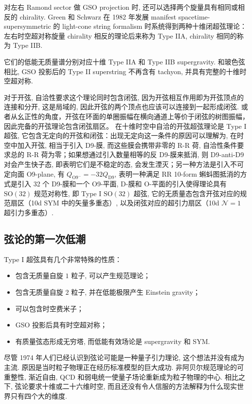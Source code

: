\documentclass[10pt]{article}
\numberwithin{equation}{section}
\begin{document}
对左右 Ramond sector 做 GSO projection 时, 还可以选择两个旋量具有相同或相反的 chirality. Green 和 Schwarz 在 1982 年发展 manifest spacetime-supersymmetric 的 light-cone string formalism 时系统得到两种十维闭超弦理论：左右时空超对称旋量 chirality 相反的理论后来称为 Type IIA, chirality 相同的称为 Type IIB\cite{GreenSchwarz1982}. 

它们的低能无质量谱分别对应十维 Type IIA 和 Type IIB supergravity. 和玻色弦相比, GSO 投影后的 Type II superstring 不再含有 tachyon, 并具有完整的十维时空超对称. 

对于开弦, 自洽性要求这个理论同时包含闭弦, 因为开弦相互作用即为开弦顶点的连接和分开, 这是局域的, 因此开弦的两个顶点也应该可以连接到一起形成闭弦.
或者从幺正性的角度，开弦在环面的单圈振幅在横向通道上等价于闭弦的树图振幅，因此完备的开弦理论包含闭弦扇区。
在十维时空中自洽的开弦超弦理论是 Type I 超弦, 它包含无定向的开弦和闭弦：出现无定向这一条件的原因可以理解为, 在时空中加入开弦, 相当于引入 D9-膜, 而这些膜会携带非零的 R-R 荷, 自洽性条件要求总的 R-R 荷为零；如果想通过引入数量相等的反 D9-膜来抵消, 则 D9-anti-D9 对会产生快子态, 即表明它们是不稳定的态, 会发生湮灭；另一种方法是引入不可定向面 O9-plane, 有 $Q_{\mathrm{O9^-}}=-32Q_{\mathrm{D 9}}$, 表明一种满足 RR 10-form 蝌蚪图抵消的方式是引入 32 个 D9-膜和一个 O9-平面, D-膜和 O-平面的引入使得理论具有 $\mathrm{SO}(32)$ 规范对称性, 即 Type I $\mathrm{SO}(32)$ 超弦, 它的无质量态包含开弦对应的规范扇区（10d SYM 中的矢量多重态）, 以及闭弦对应的超引力扇区（10d $\mathcal{N}=1$ 超引力多重态）\cite{Polchinski1995}. 

\subsection{弦论的第一次低潮}
Type I 超弦具有几个非常特殊的性质：
\begin{itemize}
  \item 包含无质量自旋 $1$ 粒子, 可以产生规范理论；
  \item 包含无质量自旋 $2$ 粒子, 并在低能极限产生 Einstein gravity；
  \item 可以包含时空费米子；
  \item GSO 投影后具有时空超对称；
  \item 有质量弦态形成无穷塔, 而低能有效场论是 supergravity 和 SYM. 
\end{itemize}

尽管 1974 年人们已经认识到弦论可能是一种量子引力理论, 这个想法并没有成为主流. 原因是当时粒子物理正在经历标准模型的巨大成功. 非阿贝尔规范理论的可重整性, 渐近自由, QCD 和弱电统一使量子场论重新成为粒子物理的中心. 相比之下, 弦论要求十维或二十六维时空, 而且还没有令人信服的方法解释为什么现实世界只有四个大的维度. 
\end{document}
